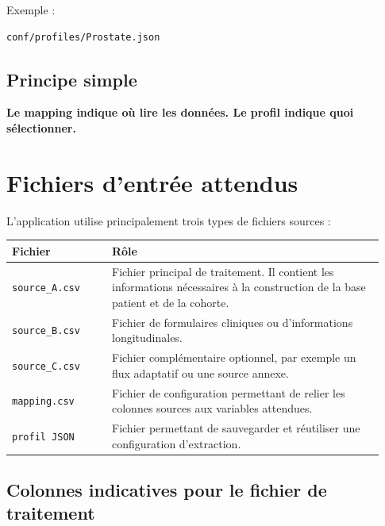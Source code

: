 \documentclass[11pt,a4paper]{article}
\newcommand{\code}[1]{\texttt{#1}}
\begin{document}
Exemple :

\begin{lstlisting}
conf/profiles/Prostate.json
\end{lstlisting}

\subsection*{Principe simple}

\begin{center}
\textbf{Le mapping indique où lire les données. Le profil indique quoi sélectionner.}
\end{center}

\section{Fichiers d'entrée attendus}

L'application utilise principalement trois types de fichiers sources :

\begin{longtable}{p{0.25\linewidth} p{0.68\linewidth}}
\toprule
\textbf{Fichier} & \textbf{Rôle} \\
\midrule
\endhead

\code{source\_A.csv} &
Fichier principal de traitement. Il contient les informations nécessaires à la construction de la base patient et de la cohorte. \\

\code{source\_B.csv} &
Fichier de formulaires cliniques ou d'informations longitudinales. \\

\code{source\_C.csv} &
Fichier complémentaire optionnel, par exemple un flux adaptatif ou une source annexe. \\

\code{mapping.csv} &
Fichier de configuration permettant de relier les colonnes sources aux variables attendues. \\

\code{profil JSON} &
Fichier permettant de sauvegarder et réutiliser une configuration d'extraction. \\

\bottomrule
\end{longtable}

\subsection{Colonnes indicatives pour le fichier de traitement}
\end{document}
